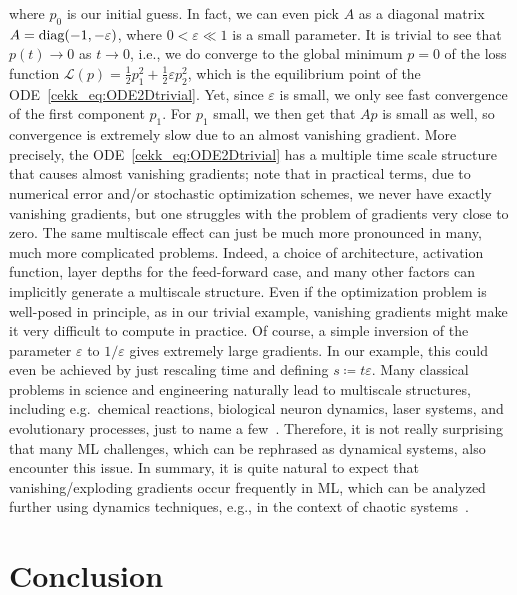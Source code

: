\documentclass[10pt]{article}
\def\cL{\mathcal{L}}
\def\ra{\rightarrow}
\begin{document}
where $p_0$ is our initial guess. In fact, we can even pick $A$ as a diagonal matrix $A=\textnormal{diag}(-1,-\varepsilon)$, where $0<\varepsilon\ll 1$ is a small parameter. It is trivial to see that $p(t)\ra 0$ as $t\ra 0$, i.e., we do converge to the global minimum $p=0$ of the loss function $\cL(p)=\frac12p_1^2+\frac12 \varepsilon p_2^2$, which is the equilibrium point of the ODE~\eqref{cekk_eq:ODE2Dtrivial}. Yet, since $\varepsilon$ is small, we only see fast convergence of the first component $p_1$. For $p_1$ small, we then get that $Ap$ is small as well, so convergence is extremely slow due to an almost vanishing gradient. More precisely, the ODE~\eqref{cekk_eq:ODE2Dtrivial} has a multiple time scale structure that causes almost vanishing gradients; note that in practical terms, due to numerical error and/or stochastic optimization schemes, we never have exactly vanishing gradients, but one struggles with the problem of gradients very close to zero. The same multiscale effect can just be much more pronounced in many, much more complicated problems. Indeed, a choice of architecture, activation function, layer depths for the feed-forward case, and many other factors can implicitly generate a multiscale structure. Even if the optimization problem is well-posed in principle, as in our trivial example, vanishing gradients might make it very difficult to compute in practice. Of course, a simple inversion of the parameter $\varepsilon$ to $1/\varepsilon$ gives extremely large gradients. In our example, this could even be achieved by just rescaling time and defining $s\coloneqq t\varepsilon$. Many classical problems in science and engineering naturally lead to multiscale structures, including e.g.~chemical reactions, biological neuron dynamics, laser systems, and evolutionary processes, just to name a few~\cite{Kuehn2015}. Therefore, it is not really surprising that many ML challenges, which can be rephrased as dynamical systems, also encounter this issue. In summary, it is quite natural to expect that vanishing/exploding gradients occur frequently in ML, which can be analyzed further using dynamics techniques, e.g., in the context of chaotic systems~\cite{Hessetal}.  

\section{Conclusion}\label{cekk_sec:concl}
\end{document}
